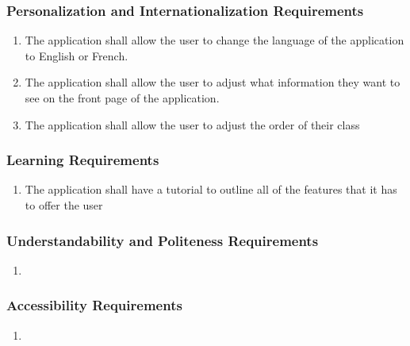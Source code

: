 \documentclass[]{article}
\begin{document}
\subsubsection{Personalization and Internationalization Requirements}
\label{ssub:personalization_and_internationalization_requirements}
\begin{enumerate}[{UH}1. ]
	\item The application shall allow the user to change the language of the 
application to English or French.
	\item The application shall allow the user to adjust what information they want 
to see on 
the front page of the application.
	\item The application shall allow the user to adjust the order of their class
\end{enumerate}

\subsubsection{Learning Requirements}
\label{ssub:learning_requirements}
\begin{enumerate}[{UH}1. ]
		\item The application shall have a tutorial to outline all of the features 
that it has to offer the user
\end{enumerate}

\subsubsection{Understandability and Politeness Requirements}
\label{ssub:understandability_and_politeness_requirements}
\begin{enumerate}[{UH}1. ]
	\item
\end{enumerate}

\subsubsection{Accessibility Requirements}
\label{ssub:accessibility_requirements}
\begin{enumerate}[{UH}1. ]
	\item
\end{enumerate}

\end{document}
